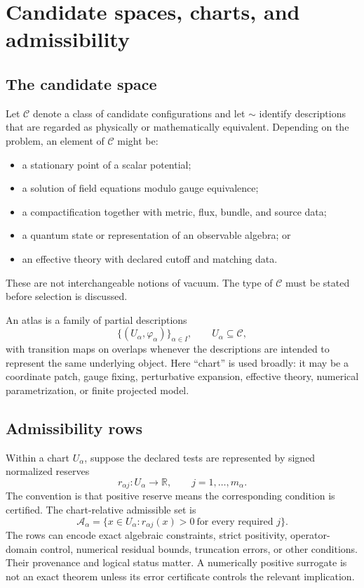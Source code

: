 \documentclass[11pt]{article}
\theoremstyle{definition}
\theoremstyle{remark}
\newcommand{\cA}{\mathcal A}
\newcommand{\cC}{\mathcal C}
\newcommand{\RR}{\mathbb R}
\newcommand{\1}{\mathbf 1}
\begin{document}
\section{Candidate spaces, charts, and admissibility}
\label{sec:charts}

\subsection{The candidate space}

Let \(\cC\) denote a class of candidate configurations and let
\(\sim\) identify descriptions that are regarded as physically or
mathematically equivalent.  Depending on the problem, an element of
\(\cC\) might be:
\begin{itemize}[leftmargin=2em]
\item a stationary point of a scalar potential;
\item a solution of field equations modulo gauge equivalence;
\item a compactification together with metric, flux, bundle, and source
      data;
\item a quantum state or representation of an observable algebra; or
\item an effective theory with declared cutoff and matching data.
\end{itemize}
These are not interchangeable notions of vacuum.  The type of
\(\cC\) must be stated before selection is discussed.

An atlas is a family of partial descriptions
\[
  \{(U_\alpha,\varphi_\alpha)\}_{\alpha\in I},
  \qquad U_\alpha\subseteq \cC,
\]
with transition maps on overlaps whenever the descriptions are intended to
represent the same underlying object.  Here ``chart'' is used broadly: it
may be a coordinate patch, gauge fixing, perturbative expansion, effective
theory, numerical parametrization, or finite projected model.

\subsection{Admissibility rows}

Within a chart \(U_\alpha\), suppose the declared tests are represented by
signed normalized reserves
\[
  r_{\alpha j}:U_\alpha\longrightarrow \RR,
  \qquad j=1,\ldots,m_\alpha.
\]
The convention is that positive reserve means the corresponding condition
is certified.  The chart-relative admissible set is
\[
  \cA_\alpha
  =
  \bigl\{x\in U_\alpha:
  r_{\alpha j}(x)>0\ \text{for every required }j\bigr\}.
\]
The rows can encode exact algebraic constraints, strict positivity,
operator-domain control, numerical residual bounds, truncation errors, or
other conditions.  Their provenance and logical status matter.  A
numerically positive surrogate is not an exact theorem unless its error
certificate controls the relevant implication.
\end{document}
